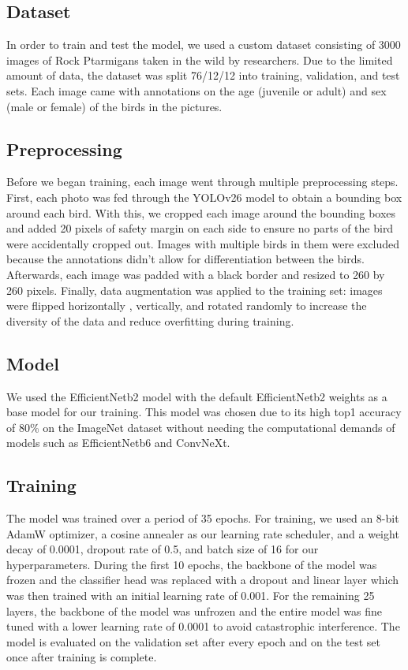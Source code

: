 \documentclass{article}
\begin{document}
\subsection{Dataset}
In order to train and test the model, we used a custom dataset consisting of 3000 images of Rock Ptarmigans taken in the wild by researchers. Due to the limited amount of data, the dataset was split 76/12/12 into training, validation, and test sets. Each image came with annotations on the age (juvenile or adult) and sex (male or female) of the birds in the pictures.

\subsection{Preprocessing}
Before we began training, each image went through multiple preprocessing steps. First, each photo was fed through the YOLOv26 model to obtain a bounding box around each bird. With this, we cropped each image around the bounding boxes and added 20 pixels of safety margin on each side to ensure no parts of the bird were accidentally cropped out. Images with multiple birds in them were excluded because the annotations didn't allow for differentiation between the birds. Afterwards, each image was padded with a black border and resized to 260 by 260 pixels. Finally, data augmentation was applied to the training set: images were flipped horizontally , vertically, and rotated randomly 
to increase the diversity of the data and reduce overfitting during training.

\subsection{Model}
We used the EfficientNetb2 model with the default EfficientNetb2 weights as a base model for our training. This model was chosen due to its high top1 accuracy of 80\% on the ImageNet dataset without needing the computational demands of models such as EfficientNetb6 and ConvNeXt. 

\subsection{Training}
The model was trained over a period of 35 epochs. For training, we used an 8-bit AdamW optimizer, a cosine annealer as our learning rate scheduler, and a weight decay of 0.0001, dropout rate of 0.5, and batch size of 16 for our hyperparameters. During the first 10 epochs, the backbone of the model was frozen and the classifier head was replaced with a dropout and linear layer which was then trained with an initial learning rate of 0.001. For the remaining 25 layers, the backbone of the model was unfrozen and the entire model was fine tuned with a lower learning rate of 0.0001 to avoid catastrophic interference. The model is evaluated on the validation set after every epoch and on the test set once after training is complete. 
\end{document}
